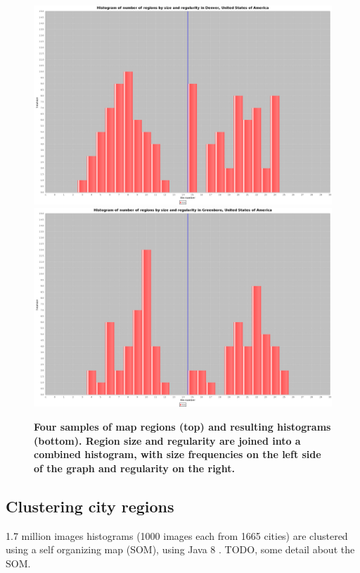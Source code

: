 \documentclass[final,3p,times,authoryear]{elsarticle}
\begin{document}
\begin{figure}[!htbp]
\includegraphics[scale=0.06]{Images/Combinedcity169-59949.png}
\includegraphics[scale=0.06]{Images/Combinedcity1521-754459.png}
\caption{\bf Four samples of map regions (top) and resulting histograms (bottom). Region size and regularity are joined into a combined histogram, with size frequencies on the left side of the graph and regularity on the right.}    
 \label{fig:mapsandHist}  
\end{figure} 

\subsection{Clustering city regions}\label{methodscluster}
1.7 million images histograms (1000 images each from 1665 cities) are clustered using a self organizing map (SOM), using Java 8 \citep{Oracle2018}.  TODO, some detail about the SOM.
\end{document}
